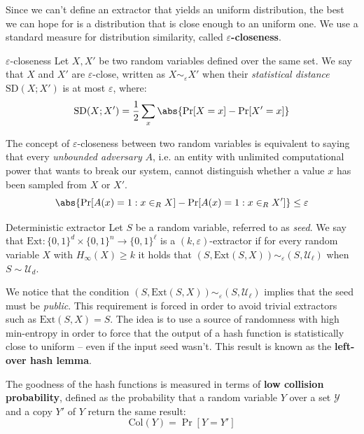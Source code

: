 \documentclass[a4paper, 12pt]{report}
\begin{document}
    Since we can't define an extractor that yields an uniform distribution, the best we can hope for is a distribution that is close enough to an uniform one. We use a standard measure for distribution similarity, called \textbf{$\varepsilon$-closeness}.

    \begin{frameddefn}{$\varepsilon$-closeness}
        Let $X,X'$ be two random variables defined over the same set. We say that $X$ and $X'$ are $\varepsilon$-close, written as $X \sim_\varepsilon X'$ when their \textit{statistical distance} $\mathrm{SD}(X; X')$ is at most $\varepsilon$, where:
        \[\mathrm{SD}(X; X') = \frac{1}{2} \sum_{x} \abs{\Pr[X=x] - \Pr[X'=x]}\]
    \end{frameddefn}

    The concept of $\varepsilon$-closeness between two random variables is equivalent to saying that every \textit{unbounded adversary} $A$, i.e. an entity with unlimited computational power that wants to break our system, cannot distinguish whether a value $x$ has been sampled from $X$ or $X'$.
    \[\abs{\Pr[A(x) = 1 : x \in_R X] - \Pr[A(x) = 1 : x \in_R X']} \leq \varepsilon\]
    
    \begin{frameddefn}{Deterministic extractor}
        Let $S$ be a random variable, referred to as \textit{seed}. We say that $\mathrm{Ext} : \{0,1\}^d \times \{0,1\}^n \to \{0,1\}^\ell$ is a $(k,\varepsilon)$-extractor if for every random variable $X$ with $H_{\infty}(X) \geq k$ it holds that $(S, \mathrm{Ext}(S,X)) \sim_{\varepsilon} (S, \mathcal{U}_\ell)$ when $S \sim \mathcal{U}_d$.
    \end{frameddefn}

    We notice that the condition $(S, \mathrm{Ext}(S,X)) \sim_{\varepsilon} (S, \mathcal{U}_\ell)$ implies that the seed must be \textit{public}. This requirement is forced in order to avoid trivial extractors such as $\mathrm{Ext}(S,X) = S$. The idea is to use a source of randomness with high min-entropy in order to force that the output of a  hash function is statistically close to uniform -- even if the input seed wasn't. This result is known as the \textbf{left-over hash lemma}.
    
    The goodness of the hash functions is measured in terms of \textbf{low collision probability}, defined as the probability that a random variable $Y$ over a set $\mathcal{Y}$ and a copy $Y'$ of $Y$ return the same result:
    \[\mathrm{Col}(Y) = \Pr[Y = Y']\]
\end{document}
